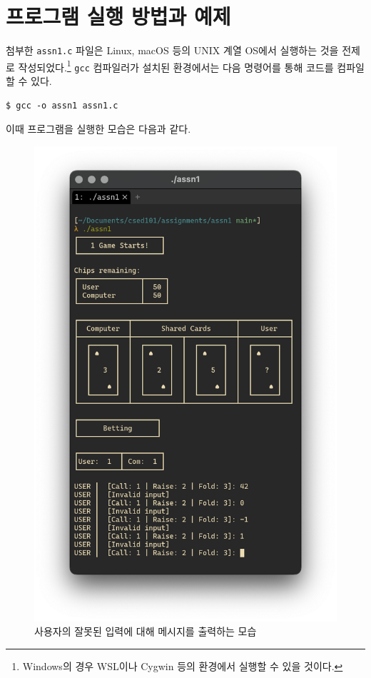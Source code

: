 \documentclass[titlepage]{article}
\begin{document}
\section{프로그램 실행 방법과 예제}

첨부한 \texttt{assn1.c} 파일은 Linux, macOS 등의 UNIX 계열 OS에서 실행하는 것을 전제로 작성되었다.\footnote{Windows의 경우 WSL이나 Cygwin 등의 환경에서 실행할 수 있을 것이다.} \texttt{gcc} 컴파일러가 설치된 환경에서는 다음 명령어를 통해 코드를 컴파일할 수 있다.

\begin{lstlisting}
$ gcc -o assn1 assn1.c
\end{lstlisting}

이때 프로그램을 실행한 모습은 다음과 같다.

\begin{figure}[H]
  \centering
  \includegraphics[width=0.6\linewidth]{invalid-input.png}
  \caption{사용자의 잘못된 입력에 대해 메시지를 출력하는 모습}
\end{figure}
\end{document}
